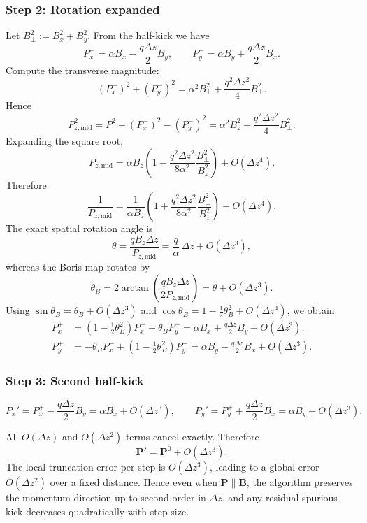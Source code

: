 \subsubsection{Step 2: Rotation expanded}
Let \(B_\perp^2 := B_x^2 + B_y^2\).
From the half-kick we have
\[
P_x^- = \alpha B_x - \frac{q\Delta z}{2} B_y,
\qquad
P_y^- = \alpha B_y + \frac{q\Delta z}{2} B_x .
\]
Compute the transverse magnitude:
\[
(P_x^-)^2 + (P_y^-)^2
= \alpha^2 B_\perp^2 + \frac{q^2\Delta z^2}{4} B_\perp^2.
\]
Hence
\[
P_{z,\mathrm{mid}}^2 = P^2 - (P_x^-)^2 - (P_y^-)^2
= \alpha^2 B_z^2 - \frac{q^2\Delta z^2}{4} B_\perp^2.
\]
Expanding the square root,
\[
P_{z,\mathrm{mid}}
= \alpha B_z \left(1 - \frac{q^2\Delta z^2}{8\alpha^2}\frac{B_\perp^2}{B_z^2}\right)
+ O(\Delta z^4).
\]
Therefore
\[
\frac{1}{P_{z,\mathrm{mid}}}
= \frac{1}{\alpha B_z}\!\left(1 + \frac{q^2\Delta z^2}{8\alpha^2}\frac{B_\perp^2}{B_z^2}\right)
+ O(\Delta z^4).
\]
The exact spatial rotation angle is
\[
\theta = \frac{q B_z \Delta z}{P_{z,\mathrm{mid}}}
       = \frac{q}{\alpha}\,\Delta z + O(\Delta z^3),
\]
whereas the Boris map rotates by
\[
\theta_B = 2\arctan\!\left(\frac{q B_z \Delta z}{2P_{z,\mathrm{mid}}}\right)
= \theta + O(\Delta z^3).
\]
Using
\(\sin\theta_B = \theta_B + O(\Delta z^3)\)
and
\(\cos\theta_B = 1 - \tfrac12\theta_B^2 + O(\Delta z^4)\),
we obtain
\begin{align*}
P_x^+ &= (1-\tfrac12\theta_B^2)P_x^- + \theta_B P_y^-
       = \alpha B_x + \frac{q\Delta z}{2}B_y + O(\Delta z^3),\\[3pt]
P_y^+ &= -\theta_B P_x^- + (1-\tfrac12\theta_B^2)P_y^-
       = \alpha B_y - \frac{q\Delta z}{2}B_x + O(\Delta z^3).
\end{align*}

\subsubsection{Step 3: Second half-kick}
\[
P_x' = P_x^+ - \frac{q\Delta z}{2}B_y = \alpha B_x + O(\Delta z^3), \qquad
P_y' = P_y^+ + \frac{q\Delta z}{2}B_x = \alpha B_y + O(\Delta z^3).
\]

All \(O(\Delta z)\) and \(O(\Delta z^2)\) terms cancel exactly.
Therefore
\[
\bm{P}' = \bm{P}^0 + O(\Delta z^3).
\]
The local truncation error per step is \(O(\Delta z^3)\), leading to a global
error \(O(\Delta z^2)\) over a fixed distance.
Hence even when \(\bm{P}\!\parallel\!\bm{B}\), the algorithm preserves the
momentum direction up to second order in \(\Delta z\), and any residual
spurious kick decreases quadratically with step size.

